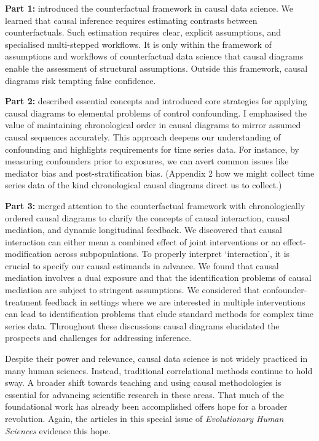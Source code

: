 \documentclass[
  singlecolumn,
  9pt]{article}
\begin{document}
\textbf{Part 1:} introduced the counterfactual framework in causal data
science. We learned that causal inference requires estimating contrasts
between counterfactuals. Such estimation requires clear, explicit
assumptions, and specialised multi-stepped workflows. It is only within
the framework of assumptions and workflows of counterfactual data
science that causal diagrams enable the assessment of structural
assumptions. Outside this framework, causal diagrams risk tempting false
confidence.

\textbf{Part 2:} described essential concepts and introduced core
strategies for applying causal diagrams to elemental problems of control
confounding. I emphasised the value of maintaining chronological order
in causal diagrams to mirror assumed causal sequences accurately. This
approach deepens our understanding of confounding and highlights
requirements for time series data. For instance, by measuring
confounders prior to exposures, we can avert common issues like mediator
bias and post-stratification bias. (Appendix 2 how we might collect time
series data of the kind chronological causal diagrams direct us to
collect.)

\textbf{Part 3:} merged attention to the counterfactual framework with
chronologically ordered causal diagrams to clarify the concepts of
causal interaction, causal mediation, and dynamic longitudinal feedback.
We discovered that causal interaction can either mean a combined effect
of joint interventions or an effect-modification across subpopulations.
To properly interpret `interaction', it is crucial to specify our causal
estimands in advance. We found that causal mediation involves a dual
exposure and that the identification problems of causal mediation are
subject to stringent assumptions. We considered that
confounder-treatment feedback in settings where we are interested in
multiple interventions can lead to identification problems that elude
standard methods for complex time series data. Throughout these
discussions causal diagrams elucidated the prospects and challenges for
addressing inference.

Despite their power and relevance, causal data science is not widely
practiced in many human sciences. Instead, traditional correlational
methods continue to hold sway. A broader shift towards teaching and
using causal methodologies is essential for advancing scientific
research in these areas. That much of the foundational work has already
been accomplished offers hope for a broader revolution. Again, the
articles in this special issue of \emph{Evolutionary Human Sciences}
evidence this hope.
\end{document}
